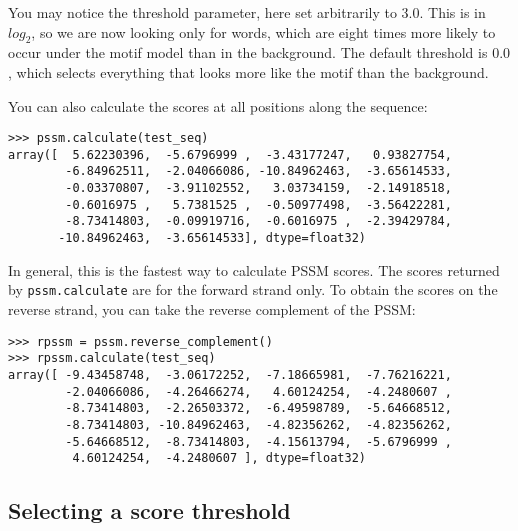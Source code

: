 You may notice the threshold parameter, here set arbitrarily to
$3.0$. This is in $log_2$, so we are now looking only for words, which
are eight times more likely to occur under the motif model than in the
background. The default threshold is $0.0$, which selects everything
that looks more like the motif than the background.

You can also calculate the scores at all positions along the sequence:
\begin{verbatim}
>>> pssm.calculate(test_seq)
array([  5.62230396,  -5.6796999 ,  -3.43177247,   0.93827754,
        -6.84962511,  -2.04066086, -10.84962463,  -3.65614533,
        -0.03370807,  -3.91102552,   3.03734159,  -2.14918518,
        -0.6016975 ,   5.7381525 ,  -0.50977498,  -3.56422281,
        -8.73414803,  -0.09919716,  -0.6016975 ,  -2.39429784,
       -10.84962463,  -3.65614533], dtype=float32)
\end{verbatim}
In general, this is the fastest way to calculate PSSM scores.
The scores returned by \verb+pssm.calculate+ are for the forward strand
only. To obtain the scores on the reverse strand, you can take the reverse
complement of the PSSM:
\begin{verbatim}
>>> rpssm = pssm.reverse_complement()
>>> rpssm.calculate(test_seq)
array([ -9.43458748,  -3.06172252,  -7.18665981,  -7.76216221,
        -2.04066086,  -4.26466274,   4.60124254,  -4.2480607 ,
        -8.73414803,  -2.26503372,  -6.49598789,  -5.64668512,
        -8.73414803, -10.84962463,  -4.82356262,  -4.82356262,
        -5.64668512,  -8.73414803,  -4.15613794,  -5.6796999 ,
         4.60124254,  -4.2480607 ], dtype=float32)
\end{verbatim}

\subsection{Selecting a score threshold}

